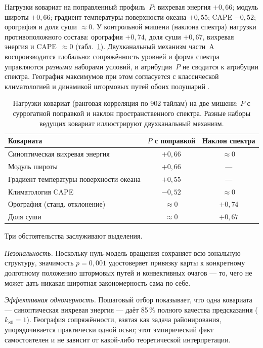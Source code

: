 \documentclass[11pt,a4paper]{article}
\begin{document}
Нагрузки ковариат на поправленный профиль~$P$: вихревая энергия $+0{,}66$; модуль широты $+0{,}66$; градиент температуры поверхности океана $+0{,}55$; CAPE $-0{,}52$; орография и доля суши $\approx0$. У контрольной мишени (наклона спектра) нагрузки противоположного состава: орография $+0{,}74$, доля суши $+0{,}67$, вихревая энергия и CAPE~$\approx0$ (табл.~\ref{tab:loadings}). Двухканальный механизм части~A воспроизводится глобально: сопряжённость уровней и форма спектра управляются \emph{разными} наборами условий, и атрибуция~$P$ не сводится к атрибуции спектра. География максимумов при этом согласуется с классической климатологией и динамикой штормовых путей обоих полушарий \cite{HoskinsValdes1990,Chang2002,Shaw2016}.

\begin{table}[t]
\centering
\caption{Нагрузки ковариат (ранговая корреляция по 902 тайлам) на две мишени: $P$ с суррогатной поправкой и наклон пространственного спектра. Разные наборы ведущих ковариат иллюстрируют двухканальный механизм.}
\label{tab:loadings}
\small
\begin{tabular}{@{}lcc@{}}
\toprule
Ковариата & $P$ с поправкой & Наклон спектра\\
\midrule
Синоптическая вихревая энергия & $+0{,}66$ & $\approx0$\\
Модуль широты & $+0{,}66$ & ---\\
Градиент температуры поверхности океана & $+0{,}55$ & ---\\
Климатология CAPE & $-0{,}52$ & $\approx0$\\
Орография (станд. отклонение) & $\approx0$ & $+0{,}74$\\
Доля суши & $\approx0$ & $+0{,}67$\\
\bottomrule
\end{tabular}
\end{table}

Три обстоятельства заслуживают выделения.

\emph{Незональность.} Поскольку нуль-модель вращения сохраняет всю зональную структуру, значимость $p=0{,}001$ удостоверяет привязку карты к конкретному долготному положению штормовых путей и конвективных очагов --- то, чего не может дать никакая широтная закономерность сама по себе.

\emph{Эффективная одномерность.} Пошаговый отбор показывает, что одна ковариата --- синоптическая вихревая энергия --- даёт 85\,\% полного качества предсказания ($k_{80}=1$). География сопряжённости, взятая как задача районирования, упорядочивается практически одной осью; этот эмпирический факт самостоятелен и не зависит от какой-либо теоретической интерпретации.
\end{document}
